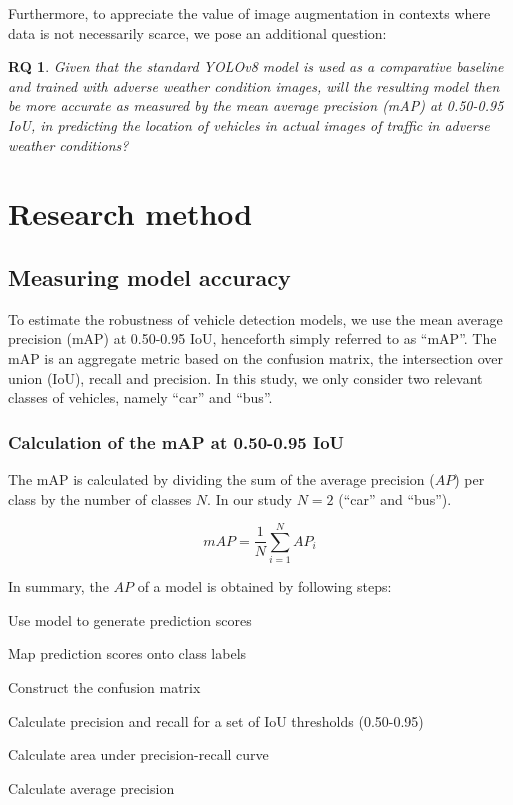 \documentclass[]{article}
\newtheorem{researchquestion}{RQ}
\begin{document}
	Furthermore, to appreciate the value of image augmentation in contexts where data is not necessarily scarce, we pose an additional question:
	\begin{researchquestion}
		\label{rq2}
		Given that the standard YOLO{\small v8} model is used as a comparative baseline and trained with adverse weather condition images, will the resulting model then be more accurate as measured by the mean average precision (mAP) at 0.50-0.95 IoU, in predicting the location of vehicles in actual images of traffic in adverse weather conditions?
	\end{researchquestion}

\section{Research method}
\subsection{Measuring model accuracy}

	To estimate the robustness of vehicle detection models, we use the mean average precision (mAP) at 0.50-0.95 IoU, henceforth simply referred to as ``mAP''. The mAP is an aggregate metric based on the confusion matrix, the intersection over union (IoU), recall and precision. In this study, we only consider two relevant classes of vehicles, namely ``car'' and ``bus''.

\subsubsection{Calculation of the mAP at 0.50-0.95 IoU}

	The mAP is calculated by dividing the sum of the average precision ($AP$) per class by the number of classes $N$.  In our study $N = 2$ (``car'' and ``bus'').
	
	\[
	mAP = \frac{1}{N} \sum_{i=1}^{N} AP_i
	\]

	In summary, the $AP$ of a model is obtained by following steps:

	\begin{center}
		\begin{compactenum}
			\item Use model to generate prediction scores
			\item Map prediction scores onto class labels
			\item Construct the confusion matrix
			\item Calculate precision and recall for a set of IoU thresholds (0.50-0.95)
			\item Calculate area under precision-recall curve
			\item Calculate average precision
		\end{compactenum}
	\end{center}
\end{document}
